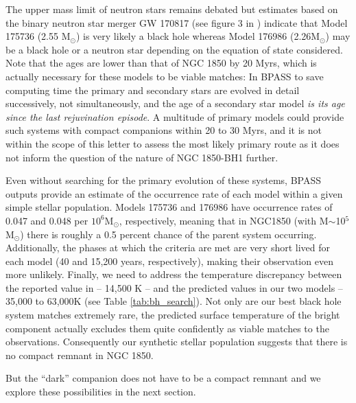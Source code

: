 \documentclass[fleqn,usenatbib]{mnras}
\newcommand{\msol} {M$_{\odot}$}
\newcommand{\about} {$\sim$}
\begin{document}
The upper mass limit of neutron stars remains debated but estimates based on the binary neutron star merger GW 170817 (see figure 3 in \citealt{abbott2018}) indicate that  Model 175736 (2.55 \msol) is very likely a black hole whereas Model 176986 (2.26\msol) may be a black hole or a neutron star depending on the equation of state considered. 
Note that the ages are lower than that of NGC 1850 by 20 Myrs, which is actually necessary for these models to be viable matches: In BPASS to save computing time the primary and secondary stars are evolved in detail successively, not simultaneously, and the age of a secondary star model \textit{is its age since the last rejuvination episode}.
A multitude of primary models could provide such systems with compact companions within 20 to 30 Myrs, and it is not within the scope of this letter to assess the most likely primary route as it does not inform the question of the nature of NGC 1850-BH1 further. 

Even without searching for the primary evolution of these systems, BPASS outputs provide an estimate of the occurrence rate of each model within a given simple stellar population. 
Models 175736 and 176986 have occurrence rates of 0.047 and 0.048 per $10^6$\msol, respectively, meaning that in NGC1850 (with M\about10$^5$\msol) there is roughly a 0.5 percent chance of the parent system occurring. 
Additionally, the phases at which the criteria are met are very short lived for each model (40 and 15,200 years, respectively), making their observation even more unlikely. 
Finally, we need to address the temperature discrepancy between the reported value in \cite{saracino2021} -- 14,500 K -- and the predicted values in our two models  -- 35,000 to 63,000K (see Table \ref{tab:bh_search}). 
Not only are our best black hole system matches extremely rare, the predicted surface temperature of the bright component actually excludes them quite confidently as viable matches to the observations.
Consequently our synthetic stellar population suggests that there is no compact remnant in NGC 1850.

But the ``dark'' companion does not have to be a compact remnant and we explore these possibilities in the next section.
\end{document}
